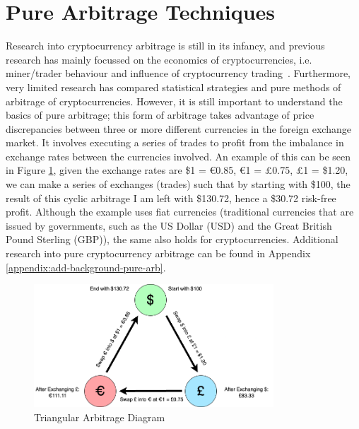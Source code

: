 \section{Pure Arbitrage Techniques}
\label{sec:pure-arb}
Research into cryptocurrency arbitrage is still in its infancy, and previous research has mainly focussed on the economics of cryptocurrencies, i.e. miner/trader behaviour and influence of cryptocurrency trading~\cite{eyal2015miner, avarikioti2020ride, huberman2021monopoly, athey2016bitcoin, easley2019mining, harvey2016cryptofinance, pagnotta2018equilibrium}. Furthermore, very limited research has compared statistical strategies and pure methods of arbitrage of cryptocurrencies. However, it is still important to understand the basics of pure arbitrage; this form of arbitrage takes advantage of price discrepancies between three or more different currencies in the foreign exchange market. It involves executing a series of trades to profit from the imbalance in exchange rates between the currencies involved. An example of this can be seen in Figure \ref{fig:tri-arb}, given the exchange rates are \$1 = \euro 0.85, \euro 1 = \pounds0.75, \pounds1 = \$1.20, we can make a series of exchanges (trades) such that by starting with \$100, the result of this cyclic arbitrage I am left with \$130.72, hence a \$30.72 risk-free profit. Although the example uses fiat currencies (traditional currencies that are issued by governments, such as the US Dollar (USD) and the Great British Pound Sterling (GBP)), the same also holds for cryptocurrencies. Additional research into pure cryptocurrency arbitrage can be found in Appendix \ref{appendix:add-background-pure-arb}.

\begin{figure}[!htb]
    \centering
    \includegraphics[width=0.8\textwidth]{background/Images/arbitrage_diagram.png}
    \caption{Triangular Arbitrage Diagram\label{fig:tri-arb}}
\end{figure}

